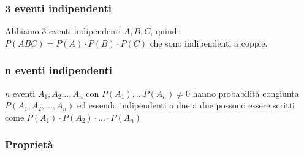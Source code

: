 \documentclass{article}
\begin{document}
\subsubsection{\underline{3 eventi indipendenti}}
Abbiamo 3 eventi indipendenti $A,B,C$, quindi
$P(ABC)=P(A)\cdot P(B)\cdot P(C)$ che sono indipendenti a coppie.

\subsubsection{\underline{n eventi indipendenti}}
$n$ eventi $A_1,A_2...,A_n$ con $P(A_1),...P(A_n)\neq0$ hanno probabilità congiunta
$P(A_1,A_2,...,A_n)$ ed essendo indipendenti a due a due possono essere
scritti come $P(A_1)\cdot P(A_2)\cdot...\cdot P(A_n)$

\subsubsection{\underline{Proprietà}}
\end{document}
